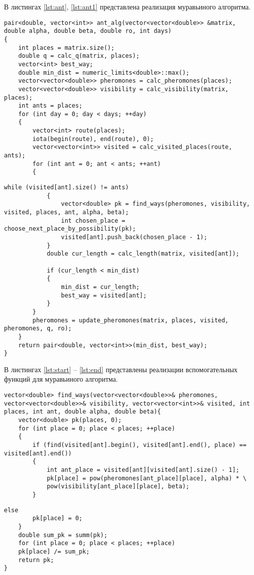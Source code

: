 В листингах \ref{lst:ant}, \ref{lst:ant1} представлена реализация муравьиного алгоритма.

\begin{center}
	\begin{lstlisting}[label=lst:ant,caption=Муравьиный алгоритм (начало)]
pair<double, vector<int>> ant_alg(vector<vector<double>> &matrix, double alpha, double beta, double ro, int days)
{
	int places = matrix.size();
	double q = calc_q(matrix, places);
	vector<int> best_way;
	double min_dist = numeric_limits<double>::max();
	vector<vector<double>> pheromones = calc_pheromones(places);
	vector<vector<double>> visibility = calc_visibility(matrix, places);
	int ants = places;
	for (int day = 0; day < days; ++day)
	{
		vector<int> route(places);
		iota(begin(route), end(route), 0);
		vector<vector<int>> visited = calc_visited_places(route, ants);
		for (int ant = 0; ant < ants; ++ant)
		{
		\end{lstlisting}
	\clearpage
\begin{lstlisting}[label=lst:ant1,caption=Муравьиный алгоритм (окончание)]
			while (visited[ant].size() != ants)
			{
				vector<double> pk = find_ways(pheromones, visibility, visited, places, ant, alpha, beta);
				int chosen_place = choose_next_place_by_possibility(pk);
				visited[ant].push_back(chosen_place - 1);
			}
			double cur_length = calc_length(matrix, visited[ant]);
			
			if (cur_length < min_dist)
			{
				min_dist = cur_length;
				best_way = visited[ant];
			}
		}
		pheromones = update_pheromones(matrix, places, visited, pheromones, q, ro);
	}
	return pair<double, vector<int>>(min_dist, best_way);
}
	\end{lstlisting}
\end{center}

В листингах \ref{lst:start} -- \ref{lst:end} представлены реализации вспомогательных функций для муравьиного алгоритма.

\begin{center}
	\begin{lstlisting}[label=lst:start,caption=Алгоритм нахождения массива вероятностей переходов (начало)]
vector<double> find_ways(vector<vector<double>>& pheromones, vector<vector<double>>& visibility, vector<vector<int>>& visited, int places, int ant, double alpha, double beta){
	vector<double> pk(places, 0);
	for (int place = 0; place < places; ++place)
	{
		if (find(visited[ant].begin(), visited[ant].end(), place) == visited[ant].end())
		{
			int ant_place = visited[ant][visited[ant].size() - 1];
			pk[place] = pow(pheromones[ant_place][place], alpha) * \
			pow(visibility[ant_place][place], beta);
		}
	\end{lstlisting}
\clearpage
\begin{lstlisting}[caption=Алгоритм нахождения массива вероятностей переходов (окончание)]
		else
		pk[place] = 0;
	}
	double sum_pk = summ(pk);
	for (int place = 0; place < places; ++place)
	pk[place] /= sum_pk;
	return pk;
}
	\end{lstlisting}
\end{center}

